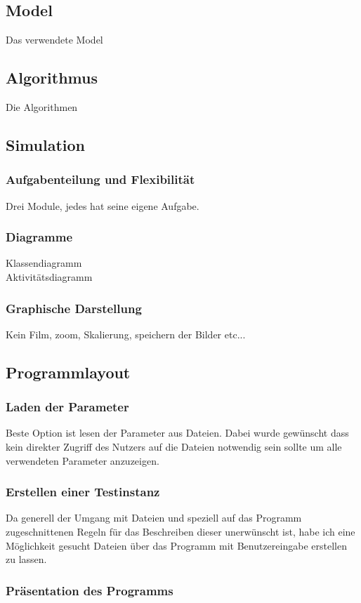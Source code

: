 \documentclass{article}
\begin{document}
	\subsection{Model}
	Das verwendete Model
	\subsection{Algorithmus}
	Die Algorithmen
	\subsection{Simulation}
		\subsubsection{Aufgabenteilung und Flexibilität}
		Drei Module, jedes hat seine eigene Aufgabe.
		\subsubsection{Diagramme}
		Klassendiagramm\\
		Aktivitätsdiagramm
		\subsubsection{Graphische Darstellung}
		Kein Film, zoom, Skalierung, speichern der Bilder etc...
	\subsection{Programmlayout}
		\subsubsection{Laden der Parameter}
		Beste Option ist lesen der Parameter aus Dateien. Dabei wurde gewünscht dass kein direkter Zugriff des Nutzers auf die Dateien notwendig sein sollte um alle verwendeten Parameter anzuzeigen.
	
		\subsubsection{Erstellen einer Testinstanz}
		Da generell der Umgang mit Dateien und speziell auf das Programm zugeschnittenen Regeln für das Beschreiben dieser unerwünscht ist, habe ich eine Möglichkeit gesucht Dateien über das Programm mit Benutzereingabe erstellen zu lassen.
		
		\subsubsection{Präsentation des Programms}
		
\end{document}
